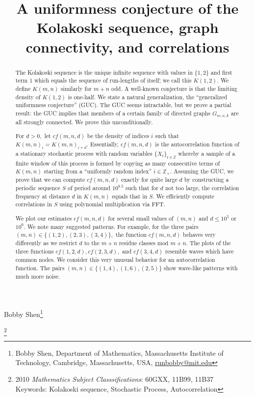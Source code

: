 \documentclass[11pt]{amsart} %
\title{A uniformness conjecture of the Kolakoski sequence, graph connectivity, and correlations}
\newcommand\blfootnote[1]{%
  \begingroup
  \renewcommand\thefootnote{}\footnote{#1}%
  \addtocounter{footnote}{-1}%
  \endgroup
}
\begin{document}
\maketitle
{\centering Bobby Shen\footnote{Bobby Shen,  Department of Mathematics, Massachusetts Institute of Technology,
Cambridge, Massachusetts, USA, \url{runbobby@mit.edu}} \par}

\newtheorem{theorem}{Theorem}[section]
\newtheorem{corollary}{Corollary}[theorem]
\newtheorem{lemma}[theorem]{Lemma}
\newtheorem{proposition}[theorem]{Proposition}
\newtheorem{conjecture}[theorem]{Conjecture}
 
\theoremstyle{definition}
\newtheorem{definition}[theorem]{Definition}
 
\theoremstyle{remark}
\newtheorem*{remark}{Remark}

\blfootnote{2010 \textit{Mathematics Subject Classsifications}: 60GXX, 11B99, 11B37 \\ Keywords: Kolakoski sequence, Stochastic Process, Autocorrelation}

\begin{abstract}
The Kolakoski sequence is the unique infinite sequence with values in $\{1,2\}$ and first term $1$ which equals the sequence of run-lengths of itself; we call this $K(1,2).$ We define $K(m,n)$ similarly for $m+n$ odd. A well-known conjecture is that the limiting density of $K(1,2)$ is one-half. We state a natural generalization, the ``generalized uniformness conjecture'' (GUC). The GUC seems intractable, but we prove a partial result: the GUC implies that members of a certain family of directed graphs $G_{m,n,k}$ are all strongly connected. We prove this unconditionally.

For $d>0,$ let $cf(m,n,d)$ be the density of indices $i$ such that $K(m, n)_i=K(m, n)_{i+d}.$ Essentially, $cf(m, n, d)$ is the autocorrelation function of a stationary stochastic process with random variables $\{X_t\}_{t\in\mathbb{Z}}$ whereby a sample of a finite window of this process is formed by copying as many consecutive terms of $K(m,n)$ starting from a ``uniformly random index'' $i\in\mathbb{Z}_+.$ Assuming the GUC, we prove that we can compute $cf(m,n,d)$ exactly for quite large $d$ by constructing a periodic sequence $S$ of period around $10^{8.5}$ such that for $d$ not too large, the correlation frequency at distance $d$ in $K(m,n)$ equals that in $S.$ We efficiently compute correlations in $S$ using polynomial multiplication via FFT. 

We plot our estimates $cf(m,n,d)$ for several small values of $(m,n)$ and $d\le10^5$ or $10^6$. We note many suggested patterns. For example, for the three pairs $(m,n)\in\{(1,2),(2,3),(3,4)\},$ the function $cf(m,n,d)$ behaves very differently as we restrict $d$ to the $m+n$ residue classes $\text{mod}$ $m+n.$ The plots of the three functions $cf(1,2,d),cf(2,3,d),$ and $cf(3,4,d)$ resemble waves which have common nodes. We consider this very unusual behavior for an autocorrelation function. The pairs $(m,n)\in\{(1,4),(1,6),(2,5)\}$ show wave-like patterns with much more noise.
\end{abstract}
\end{document}
